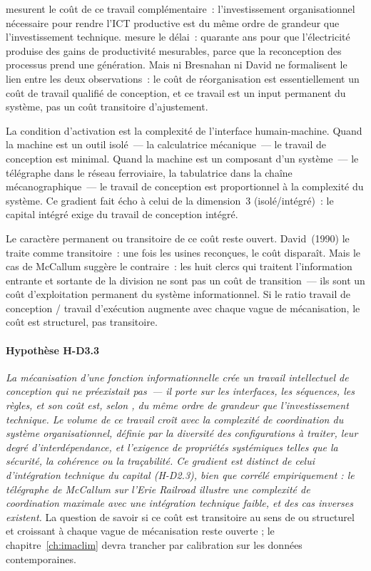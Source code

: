 \textcite{bresnahan_information_2002} mesurent le coût de ce travail complémentaire~: l'investissement organisationnel nécessaire pour rendre l'ICT productive est du même ordre de grandeur que l'investissement technique. \textcite{david_dynamo_1990} mesure le délai~: quarante ans pour que l'électricité produise des gains de productivité mesurables, parce que la reconception des processus prend une génération. Mais ni Bresnahan ni David ne formalisent le lien entre les deux observations~: le coût de réorganisation est essentiellement un coût de travail qualifié de conception, et ce travail est un input permanent du système, pas un coût transitoire d'ajustement.

La condition d'activation est la complexité de l'interface humain-machine. Quand la machine est un outil isolé~--- la calculatrice mécanique~--- le travail de conception est minimal. Quand la machine est un composant d'un système~--- le télégraphe dans le réseau ferroviaire, la tabulatrice dans la chaîne mécanographique~--- le travail de conception est proportionnel à la complexité du système. Ce gradient fait écho à celui de la dimension~3 (isolé/intégré)~: le capital intégré exige du travail de conception intégré.

Le caractère permanent ou transitoire de ce coût reste ouvert. David~(1990) le traite comme transitoire~: une fois les usines reconçues, le coût disparaît. Mais le cas de McCallum suggère le contraire~: les huit clercs qui traitent l'information entrante et sortante de la division ne sont pas un coût de transition~--- ils sont un coût d'exploitation permanent du système informationnel. Si le ratio travail de conception / travail d'exécution augmente avec chaque vague de mécanisation, le coût est structurel, pas transitoire.


\paragraph{Hypothèse H-D3.3} \emph{La mécanisation d'une fonction informationnelle crée un travail intellectuel de conception qui ne préexistait pas~--- il porte sur les interfaces, les séquences, les règles, et son coût est, selon \textcite{bresnahan_information_2002}, du même ordre de grandeur que l'investissement technique. Le volume de ce travail croît avec la \emph{complexité de coordination} du système organisationnel, définie par la diversité des configurations à traiter, leur degré d'interdépendance, et l'exigence de propriétés systémiques telles que la sécurité, la cohérence ou la traçabilité. Ce gradient est distinct de celui d'intégration technique du capital (H-D2.3), bien que corrélé empiriquement : le télégraphe de McCallum sur l'\emph{Erie Railroad} illustre une complexité de coordination maximale avec une intégration technique faible, et des cas inverses existent.} La question de savoir si ce coût est transitoire au sens de \textcite{david_dynamo_1990} ou structurel et croissant à chaque vague de mécanisation reste ouverte ; le chapitre~\ref{ch:imaclim} devra trancher par calibration sur les données contemporaines.

